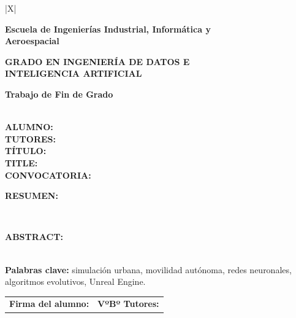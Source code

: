\noindent
\begin{tabularx}{\textwidth}{|X|}
\hline
\begin{center}
  \vspace{0.25cm}
  {\bfseries\fontsize{16}{19}\selectfont \universidad\par}
  \vspace{0.15cm}
  {\bfseries\fontsize{15}{18}\selectfont Escuela de Ingenierías Industrial, Informática y\\Aeroespacial\par}
  \vspace{0.45cm}
  {\bfseries\fontsize{14}{16}\selectfont GRADO EN INGENIERÍA DE DATOS E\\INTELIGENCIA ARTIFICIAL\par}
  \vspace{0.08cm}
  {\bfseries\fontsize{14}{16}\selectfont Trabajo de Fin de Grado\par}
  \vspace{0.25cm}
\end{center}
\\
\hline
\textbf{ALUMNO:} \autor\\
\hline
\textbf{TUTORES:} \tutores\\
\hline
\textbf{TÍTULO:} \tituloTFG\\
\hline
\textbf{TITLE:} \tituloTFGEng\\
\hline
\textbf{CONVOCATORIA:} \convocatoria\\
\hline
\begin{minipage}[t][4.25cm][t]{\dimexpr\linewidth-2\tabcolsep\relax}
\textbf{RESUMEN:}\\[0.06cm]
\resumenFicha
\end{minipage}\\
\hline
\begin{minipage}[t][4.25cm][t]{\dimexpr\linewidth-2\tabcolsep\relax}
\textbf{ABSTRACT:}\\[0.06cm]
\abstractFicha
\end{minipage}\\
\hline
\textbf{Palabras clave:} simulación urbana, movilidad autónoma, redes neuronales, algoritmos evolutivos, Unreal Engine.\\
\hline
\begin{tabular}{p{}|p{}}
\textbf{Firma del alumno:} & \textbf{VºBº Tutores:}\\[1.35cm]
\end{tabular}\\
\hline
\end{tabularx}

